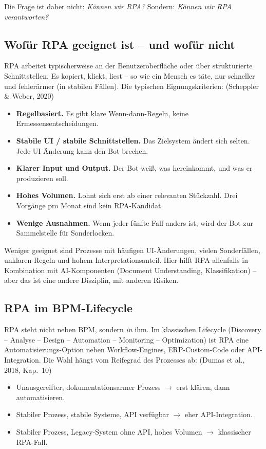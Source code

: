 \documentclass[11pt,a4paper,oneside]{article}
\newcommand{\quelle}[1]{{\footnotesize\color{lpGray}(#1)}}
\begin{document}
Die Frage ist daher nicht: \emph{Können wir RPA?} Sondern: \emph{Können wir RPA verantworten?}

\subsection{Wofür RPA geeignet ist -- und wofür nicht}

RPA arbeitet typischerweise an der Benutzeroberfläche oder über strukturierte Schnittstellen. Es kopiert, klickt, liest -- so wie ein Mensch es täte, nur schneller und fehlerärmer (in stabilen Fällen). Die typischen Eignungskriterien: \quelle{Scheppler \& Weber, 2020}

\begin{itemize}
  \item \textbf{Regelbasiert.} Es gibt klare Wenn-dann-Regeln, keine Ermessensentscheidungen.
  \item \textbf{Stabile UI / stabile Schnittstellen.} Das Zielsystem ändert sich selten. Jede UI-Änderung kann den Bot brechen.
  \item \textbf{Klarer Input und Output.} Der Bot weiß, was hereinkommt, und was er produzieren soll.
  \item \textbf{Hohes Volumen.} Lohnt sich erst ab einer relevanten Stückzahl. Drei Vorgänge pro Monat sind kein RPA-Kandidat.
  \item \textbf{Wenige Ausnahmen.} Wenn jeder fünfte Fall anders ist, wird der Bot zur Sammelstelle für Sonderlocken.
\end{itemize}

Weniger geeignet sind Prozesse mit häufigen UI-Änderungen, vielen Sonderfällen, unklaren Regeln und hohem Interpretationsanteil. Hier hilft RPA allenfalls in Kombination mit AI-Komponenten (Document Understanding, Klassifikation) -- aber das ist eine andere Disziplin, mit anderen Risiken.

\subsection{RPA im BPM-Lifecycle}

RPA steht nicht neben BPM, sondern \emph{in} ihm. Im klassischen Lifecycle (Discovery -- Analyse -- Design -- Automation -- Monitoring -- Optimization) ist RPA eine Automatisierungs-Option neben Workflow-Engines, ERP-Custom-Code oder API-Integration. Die Wahl hängt vom Reifegrad des Prozesses ab: \quelle{Dumas et al., 2018, Kap.~10}

\begin{itemize}
  \item Unausgereifter, dokumentationsarmer Prozess $\to$ erst klären, dann automatisieren.
  \item Stabiler Prozess, stabile Systeme, API verfügbar $\to$ eher API-Integration.
  \item Stabiler Prozess, Legacy-System ohne API, hohes Volumen $\to$ klassischer RPA-Fall.
\end{itemize}
\end{document}
